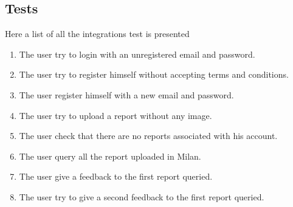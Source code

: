 \documentclass[../ITD.tex]{subfiles}
\begin{document}
    \subsection{Tests}\label{subsec:tests}
    Here a list of all the integrations test is presented
    \begin{enumerate}
        \item The user try to login with an unregistered email and password.
        \item The user try to register himself without accepting terms and conditions.
        \item The user register himself with a new email and password.
        \item The user try to upload a report without any image.
        \item The user check that there are no reports associated with his account.
        \item The user query all the report uploaded in Milan.
        \item The user give a feedback to the first report queried.
        \item The user try to give a second feedback to the first report queried.
    \end{enumerate}
\end{document}
